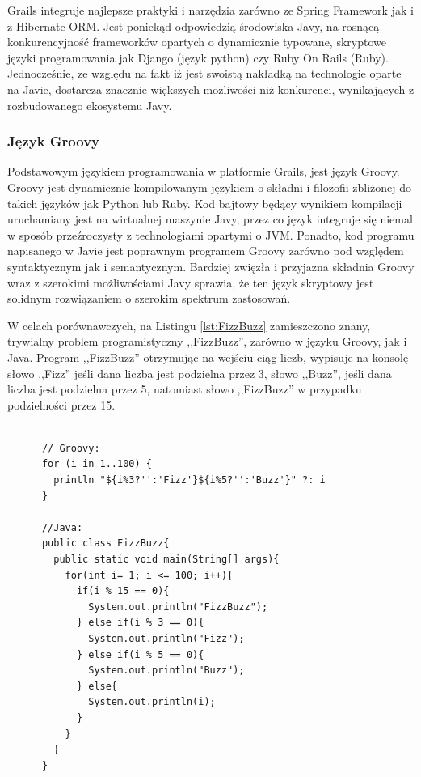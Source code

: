    Grails integruje najlepsze praktyki i narzędzia zarówno ze Spring Framework jak i z Hibernate ORM. Jest poniekąd odpowiedzią środowiska Javy, na rosnącą konkurencyjność frameworków opartych o dynamicznie typowane, skryptowe języki programowania jak Django (język python) czy Ruby On Rails (Ruby). Jednocześnie, ze względu na fakt iż jest swoistą nakładką na technologie oparte na Javie, dostarcza znacznie większych możliwości niż konkurenci, wynikających z rozbudowanego ekosystemu Javy.


    \subsubsection{Język Groovy}

      Podstawowym językiem programowania w platformie Grails, jest język Groovy. Groovy jest dynamicznie kompilowanym językiem o składni i filozofii zbliżonej do takich języków jak Python lub Ruby. Kod bajtowy będący wynikiem kompilacji uruchamiany jest na wirtualnej maszynie Javy, przez co język integruje się niemal w sposób przeźroczysty z technologiami opartymi o JVM. Ponadto, kod programu napisanego w Javie jest poprawnym programem Groovy zarówno pod względem syntaktycznym jak i semantycznym. Bardziej zwięzła i przyjazna składnia Groovy wraz z szerokimi możliwościami Javy sprawia, że ten język skryptowy jest solidnym rozwiązaniem o szerokim spektrum zastosowań.

      W celach porównawczych, na Listingu \ref{lst:FizzBuzz} zamieszczono znany, trywialny problem programistyczny ,,FizzBuzz'', zarówno w języku Groovy, jak i Java. Program ,,FizzBuzz'' otrzymując na wejściu ciąg liczb, wypisuje na konsolę słowo ,,Fizz'' jeśli dana liczba jest podzielna przez 3, słowo ,,Buzz'', jeśli dana liczba jest podzielna przez 5, natomiast słowo ,,FizzBuzz'' w przypadku podzielności przez 15.

      \begin{lstlisting}[caption={Program FizzBuzz}, label={lst:FizzBuzz}]

      // Groovy:
      for (i in 1..100) {
        println "${i%3?'':'Fizz'}${i%5?'':'Buzz'}" ?: i
      }    

      //Java:
      public class FizzBuzz{
        public static void main(String[] args){
          for(int i= 1; i <= 100; i++){
            if(i % 15 == 0){
              System.out.println("FizzBuzz");
            } else if(i % 3 == 0){
              System.out.println("Fizz");
            } else if(i % 5 == 0){
              System.out.println("Buzz");
            } else{
              System.out.println(i);
            }
          }
        }
      }

    \end{lstlisting}

